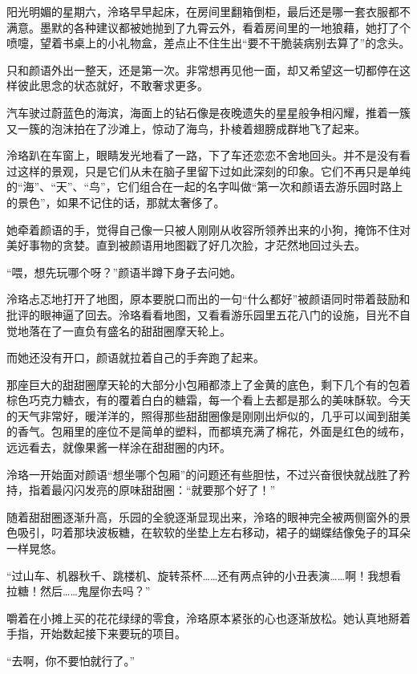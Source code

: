 \documentclass[UTF8, scheme = chinese, openany]{ctexbook}
\begin{document}
\vspace{1.5em}

阳光明媚的星期六，泠珞早早起床，在房间里翻箱倒柜，最后还是哪一套衣服都不满意。墨默的各种建议都被她抛到了九霄云外，看着房间里的一地狼藉，她打了个喷嚏，望着书桌上的小礼物盒，差点止不住生出“要不干脆装病别去算了”的念头。

只和颜语外出一整天，还是第一次。非常想再见他一面，却又希望这一切都停在这样彼此思念的状态就好，不敢奢求更多。

汽车驶过蔚蓝色的海滨，海面上的钻石像是夜晚遗失的星星般争相闪耀，推着一簇又一簇的泡沫拍在了沙滩上，惊动了海鸟，扑棱着翅膀成群地飞了起来。

泠珞趴在车窗上，眼睛发光地看了一路，下了车还恋恋不舍地回头。并不是没有看过这样的景观，只是它们从未在脑子里留下过如此深刻的印象。它们不再只是单纯的“海”、“天”、“鸟”，它们组合在一起的名字叫做“第一次和颜语去游乐园时路上的景色”，如果不记住的话，那就太奢侈了。

她牵着颜语的手，觉得自己像一只被人刚刚从收容所领养出来的小狗，掩饰不住对美好事物的贪婪。直到被颜语用地图戳了好几次脸，才茫然地回过头去。

“喂，想先玩哪个呀？”颜语半蹲下身子去问她。

泠珞忐忑地打开了地图，原本要脱口而出的一句“什么都好”被颜语同时带着鼓励和批评的眼神逼了回去。泠珞看看地图，又看看游乐园里五花八门的设施，目光不自觉地落在了一直负有盛名的甜甜圈摩天轮上。

而她还没有开口，颜语就拉着自己的手奔跑了起来。

那座巨大的甜甜圈摩天轮的大部分小包厢都漆上了金黄的底色，剩下几个有的包着棕色巧克力糖衣，有的覆着白白的糖霜，每一个看上去都是那么的美味酥软。今天的天气非常好，暖洋洋的，照得那些甜甜圈像是刚刚出炉似的，几乎可以闻到甜美的香气。包厢里的座位不是简单的塑料，而都填充满了棉花，外面是红色的绒布，远远看去，就像果酱一样涂在甜甜圈的内环。

泠珞一开始面对颜语“想坐哪个包厢”的问题还有些胆怯，不过兴奋很快就战胜了矜持，指着最闪闪发亮的原味甜甜圈：“就要那个好了！”

随着甜甜圈逐渐升高，乐园的全貌逐渐显现出来，泠珞的眼神完全被两侧窗外的景色吸引，叼着那块波板糖，在软软的坐垫上左右移动，裙子的蝴蝶结像兔子的耳朵一样晃悠。

“过山车、机器秋千、跳楼机、旋转茶杯……还有两点钟的小丑表演……啊！我想看拉糖！然后……鬼屋你去吗？”

嚼着在小摊上买的花花绿绿的零食，泠珞原本紧张的心也逐渐放松。她认真地掰着手指，开始数起接下来要玩的项目。

“去啊，你不要怕就行了。”
\end{document}
